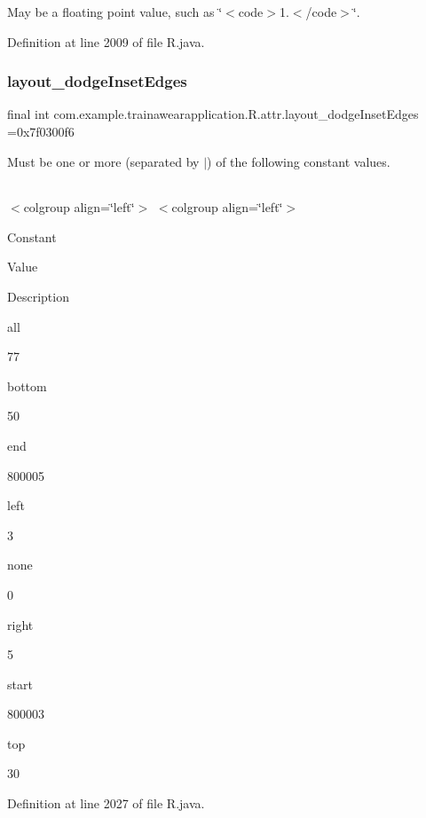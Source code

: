 May be a floating point value, such as \char`\"{}$<$code$>$1.$<$/code$>$\char`\"{}. 

Definition at line 2009 of file R.\+java.

\mbox{\label{classcom_1_1example_1_1trainawearapplication_1_1_r_1_1attr_a8962615fce01a8841ab265216464ccc5}} 
\subsubsection{\texorpdfstring{layout\_dodgeInsetEdges}{layout\_dodgeInsetEdges}}
{\footnotesize\ttfamily final int com.\+example.\+trainawearapplication.\+R.\+attr.\+layout\+\_\+dodge\+Inset\+Edges =0x7f0300f6\hspace{0.3cm}{\ttfamily [static]}}

Must be one or more (separated by \textquotesingle{}$\vert$\textquotesingle{}) of the following constant values.

\tabulinesep=1mm
\begin{longtabu}spread 0pt [c]{*{0}{|X[-1]}|}
\hline
\end{longtabu}
$<$colgroup align=\char`\"{}left\char`\"{}$>$ $<$colgroup align=\char`\"{}left\char`\"{}$>$ 

Constant

Value

Description 

all

77

bottom

50

end

800005

left

3

none

0

right

5

start

800003

top

30

Definition at line 2027 of file R.\+java.

